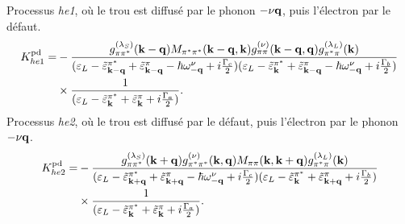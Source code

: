 Processus \textit{he1}, où le trou est diffusé par le phonon $-\nu\mathbf{q}$, puis l'électron par le défaut.
\begin{equation}
    \begin{split}
    K_{he1}^{\text{pd}} = &-\frac{g^{(\lambda_S)}_{\pi\pi^*}(\mathbf{k}-\mathbf{q})M_{\pi^*\pi^*}(\mathbf{k}-\mathbf{q}, \mathbf{k})g_{\pi\pi}^{(\nu)}(\mathbf{k}-\mathbf{q},\mathbf{q})g_{\pi^*\pi}^{(\lambda_L)}(\mathbf{k})}{(\varepsilon_L-\tilde{\varepsilon}_{\mathbf{k}-\mathbf{q}}^{\pi^*}+\tilde{\varepsilon}_{\mathbf{k}-\mathbf{q}}^\pi-\hbar\omega_{-\mathbf{q}}^\nu+i\frac{\Gamma_c}{2})(\varepsilon_L-\tilde{\varepsilon}_{\mathbf{k}}^{\pi^*}+\tilde{\varepsilon}_{\mathbf{k}-\mathbf{q}}^\pi-\hbar\omega_{-\mathbf{q}}^\nu+i\frac{\Gamma_b}{2})}\\
    &\times\frac{1}{(\varepsilon_L-\tilde{\varepsilon}_{\mathbf{k}}^{\pi^*}+\tilde{\varepsilon}_{\mathbf{k}}^\pi+i\frac{\Gamma_a}{2})}.\label{eqn:pd_he1}
    \end{split}
\end{equation}
Processus \textit{he2}, où le trou est diffusé par le défaut, puis l'électron par le phonon $-\nu\mathbf{q}$.
\begin{equation}
    \begin{split}
    K_{he2}^{\text{pd}} = &-\frac{g^{(\lambda_S)}_{\pi\pi^*}(\mathbf{k}+\mathbf{q})g^{(\nu)}_{\pi^*\pi^*}(\mathbf{k},\mathbf{q})M_{\pi\pi}(\mathbf{k},\mathbf{k}+\mathbf{q})g_{\pi^*\pi}^{(\lambda_L)}(\mathbf{k})}{(\varepsilon_L-\tilde{\varepsilon}_{\mathbf{k}+\mathbf{q}}^{\pi^*}+\tilde{\varepsilon}_{\mathbf{k}+\mathbf{q}}^\pi-\hbar\omega_{-\mathbf{q}}^\nu+i\frac{\Gamma_c}{2})(\varepsilon_L-\tilde{\varepsilon}_{\mathbf{k}}^{\pi^*}+\tilde{\varepsilon}_{\mathbf{k}+\mathbf{q}}^\pi+i\frac{\Gamma_b}{2})}\\
    &\times\frac{1}{(\varepsilon_L-\tilde{\varepsilon}_{\mathbf{k}}^{\pi^*}+\tilde{\varepsilon}_{\mathbf{k}}^\pi+i\frac{\Gamma_a}{2})}.\label{eqn:pd_he2}
    \end{split}
\end{equation}